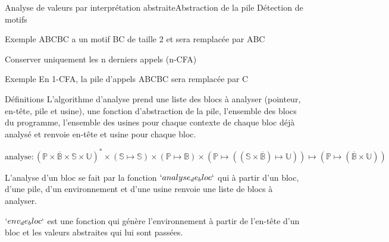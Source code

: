 \documentclass{beamer}
\begin{document}
\begin{frame}{Analyse de valeurs par interprétation abstraite}{Abstraction de la pile}
    Détection de motifs

    \begin{exampleblock}{Exemple}
        ABCBC a un motif BC de taille 2 et sera remplacée par ABC
    \end{exampleblock}

    Conserver uniquement les n derniers appels (n-CFA)

    \begin{exampleblock}{Exemple}
        En 1-CFA, la pile d'appels ABCBC sera remplacée par C
    \end{exampleblock}
\end{frame}

\iffalse
\begin{frame}{Définitions}
    L'algorithme d'analyse prend une liste des blocs à analyser (pointeur, en-tête, pile et usine), une fonction d'abstraction de la pile, l'ensemble des blocs du programme, l'ensemble des usines pour chaque contexte de chaque bloc déjà analysé et renvoie en-tête et usine pour chaque bloc.

    $\text{analyse} : (\mathbb{P} \times \overline{\mathbb{B}} \times \mathbb{S} \times \mathbb{U})^{*} \times (\mathbb{S} \mapsto \mathbb{S}) \times (\mathbb{P} \mapsto \mathbb{B}) \times (\mathbb{P} \mapsto ((\mathbb{S} \times \overline{\mathbb{B}}) \mapsto \mathbb{U})) \mapsto (\mathbb{P} \mapsto (\overline{\mathbb{B}} \times \mathbb{U}))$

    L'analyse d'un bloc se fait par la fonction $`analyse_de_bloc`$ qui à partir d'un bloc, d'une pile, d'un environnement et d'une usine renvoie une liste de blocs à analyser.

    $`env_de_bloc`$ est une fonction qui génère l'environnement à partir de l'en-tête d'un bloc et les valeurs abstraites qui lui sont passées.
\end{frame}
\end{document}
